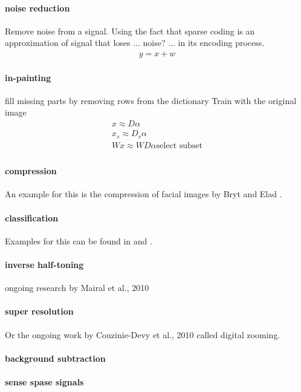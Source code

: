 \paragraph{noise reduction}
Remove noise from a signal. 
Using the fact that sparse coding is an approximation of signal that loses ... noise? ... in its encoding process. 
\begin{align*}
y = x + w
\end{align*}



\cite{Elad2006}

\paragraph{in-painting}
fill missing parts by removing rows from the dictionary
Train with the original image
\begin{align*}
x \approx D\alpha\\
x_s \approx D_s\alpha\\
Wx \approx WD\alpha\text{select subset}\\
\end{align*}

\cite{mairal08sparse}

\paragraph{compression} \cite{Murray2006} \cite{Lewicki1999} An example for this is the compression of facial images by Bryt and Elad \cite{Bryt2008}.

\paragraph{classification} Examples for this can be found in \cite{Mairal2008b} and \cite{Bar2009}.
\paragraph{inverse half-toning} ongoing research by Mairal et al., 2010 \cite{Mairal2010b}
\paragraph{super resolution} \cite{Yang2010} \cite{Wright2008}  
Or the ongoing work by Couzinie-Devy et al., 2010 called digital zooming.
\paragraph{background subtraction} \cite{}

\paragraph{sense spase signals}\cite{Duarte2009}






